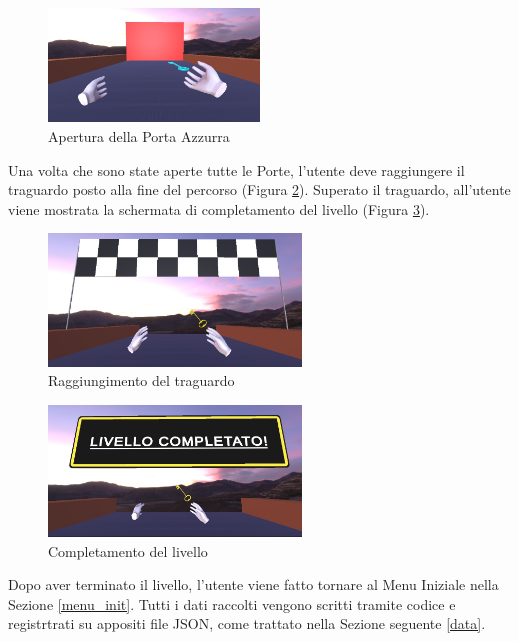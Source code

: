 \documentclass[target=bach,aauheader=]{thud}
\begin{document}
\begin{figure}[h]
    \centering
    \includegraphics[width=0.50\textwidth]{lvl4}
    \caption{Apertura della Porta Azzurra}
    \label{fig:lvl4}
\end{figure}

\newpage
Una volta che sono state aperte tutte le Porte, l'utente deve raggiungere il traguardo posto alla fine del percorso (Figura \ref{fig:lvl5}).
Superato il traguardo, all'utente viene mostrata la schermata di completamento del livello (Figura \ref{fig:lvl6}). \\

\begin{figure}[h]
    \centering
    \includegraphics[width=0.60\textwidth]{lvl5}
    \caption{Raggiungimento del traguardo}
    \label{fig:lvl5}
\end{figure}

\begin{figure}[h]
    \centering
    \includegraphics[width=0.60\textwidth]{lvl6}
    \caption{Completamento del livello}
    \label{fig:lvl6}
\end{figure}

Dopo aver terminato il livello, l'utente viene fatto tornare al Menu Iniziale nella Sezione \ref{menu_init}.
Tutti i dati raccolti vengono scritti tramite codice e registrtrati su appositi file JSON, come trattato nella Sezione seguente \ref{data}.
\end{document}

